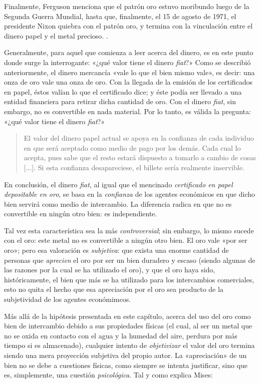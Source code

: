 \documentclass[12pt,a4paper,twoside]{book}
\begin{document}
Finalmente, Ferguson menciona que el patrón oro estuvo moribundo luego de la Segunda Guerra Mundial, hasta que, finalmente, el 15 de agosto de 1971, el presidente Nixon quiebra con el patrón oro, y termina con la vinculación entre el dinero papel y el metal precioso. \cite[pág. 76]{triunfo-dinero}.

Generalmente, para aquel que comienza a leer acerca del dinero, es en este punto donde surge la interrogante: «¿qué valor tiene el dinero \textit{fiat}?» Como se describió anteriormente, el dinero mercancía «vale lo que el bien mismo vale», es decir: una onza de oro vale una onza de oro. Con la llegada de la emisión de los certificados en papel, éstos valían lo que el certificado dice; y éste podía ser llevado a una entidad financiera para retirar dicha cantidad de oro. Con el dinero \textit{fiat}, sin embargo, no es convertible en nada material. Por lo tanto, es válida la pregunta: «¿qué valor tiene el dinero \textit{fiat}?»

\begin{quotation}
El valor del dinero papel actual se apoya en la confianza de cada individuo en que será aceptado como medio de pago por los demás. Cada cual lo acepta, pues sabe que el resto estará dispuesto a tomarlo a cambio de cosas [...]. Si esta confianza desapareciese, el billete sería realmente inservible. \cite[pág. 266]{mochobeker}
\end{quotation}

En conclusión, el dinero \textit{fiat}, al igual que el mencinado \textit{certificado en papel depositable en oro}, se basa en la \textit{confianza} de los agentes económicos en que dicho bien servirá como medio de intercambio. La diferencia radica en que no es convertible en ningún otro bien: es independiente.

Tal vez esta característica sea la más \textit{controversial}; sin embargo, lo mismo sucede con el oro: este metal no es convertible a ningún otro bien. El oro vale «por ser oro»; pero esa valoración es \textit{subjetiva}: que exista una enorme cantidad de personas que \textit{aprecien} el oro por ser un bien duradero y escaso (siendo algunas de las razones por la cual se ha utilizado el oro), y que el oro haya sido, históricamente, el bien que más se ha utilizado para los intercambios comerciales, esto no quita el hecho que esa apreciación por el oro sea producto de la subjetividad de los agentes económimcos.

Más allá de la hipótesis presentada en este capítulo, acerca del uso del oro como bien de intercambio debido a sus propiedades físicas (el cual, al ser un metal que no se oxida en contacto con el agua y la humedad del aire, perdura por más tiempo si es almacenado), cualquier intento de \textit{objetivizar} el valor del oro termina siendo una mera proyección subjetiva del propio autor. La «apreciación» de un bien no se debe a cuestiones físicas, como siempre se intenta justificar, sino que es, simplemente, una cuestión \textit{psicológica}. Tal y como explica Mises:
\end{document}
